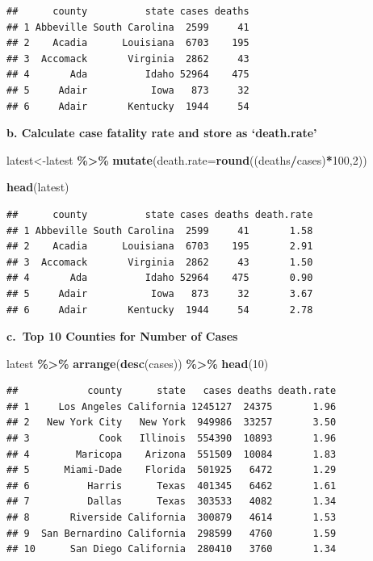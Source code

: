 \documentclass[
  openany]{book}
\newenvironment{Shaded}{\begin{snugshade}}{\end{snugshade}}
\newcommand{\AttributeTok}[1]{\textcolor[rgb]{0.13,0.29,0.53}{#1}}
\newcommand{\DecValTok}[1]{\textcolor[rgb]{0.00,0.00,0.81}{#1}}
\newcommand{\FunctionTok}[1]{\textcolor[rgb]{0.13,0.29,0.53}{\textbf{#1}}}
\newcommand{\NormalTok}[1]{#1}
\newcommand{\OtherTok}[1]{\textcolor[rgb]{0.56,0.35,0.01}{#1}}
\newcommand{\SpecialCharTok}[1]{\textcolor[rgb]{0.81,0.36,0.00}{\textbf{#1}}}
\begin{document}
\begin{verbatim}
##      county          state cases deaths
## 1 Abbeville South Carolina  2599     41
## 2    Acadia      Louisiana  6703    195
## 3  Accomack       Virginia  2862     43
## 4       Ada          Idaho 52964    475
## 5     Adair           Iowa   873     32
## 6     Adair       Kentucky  1944     54
\end{verbatim}

\textbf{b. Calculate case fatality rate and store as `death.rate'}

\begin{Shaded}
\begin{Highlighting}[]
\NormalTok{latest}\OtherTok{\textless{}{-}}\NormalTok{latest }\SpecialCharTok{\%\textgreater{}\%} 
  \FunctionTok{mutate}\NormalTok{(}\AttributeTok{death.rate=}\FunctionTok{round}\NormalTok{((deaths}\SpecialCharTok{/}\NormalTok{cases)}\SpecialCharTok{*}\DecValTok{100}\NormalTok{,}\DecValTok{2}\NormalTok{))}

\FunctionTok{head}\NormalTok{(latest)}
\end{Highlighting}
\end{Shaded}

\begin{verbatim}
##      county          state cases deaths death.rate
## 1 Abbeville South Carolina  2599     41       1.58
## 2    Acadia      Louisiana  6703    195       2.91
## 3  Accomack       Virginia  2862     43       1.50
## 4       Ada          Idaho 52964    475       0.90
## 5     Adair           Iowa   873     32       3.67
## 6     Adair       Kentucky  1944     54       2.78
\end{verbatim}

\textbf{c.~Top 10 Counties for Number of Cases}

\begin{Shaded}
\begin{Highlighting}[]
\NormalTok{latest }\SpecialCharTok{\%\textgreater{}\%} 
  \FunctionTok{arrange}\NormalTok{(}\FunctionTok{desc}\NormalTok{(cases)) }\SpecialCharTok{\%\textgreater{}\%} 
  \FunctionTok{head}\NormalTok{(}\DecValTok{10}\NormalTok{)}
\end{Highlighting}
\end{Shaded}

\begin{verbatim}
##            county      state   cases deaths death.rate
## 1     Los Angeles California 1245127  24375       1.96
## 2   New York City   New York  949986  33257       3.50
## 3            Cook   Illinois  554390  10893       1.96
## 4        Maricopa    Arizona  551509  10084       1.83
## 5      Miami-Dade    Florida  501925   6472       1.29
## 6          Harris      Texas  401345   6462       1.61
## 7          Dallas      Texas  303533   4082       1.34
## 8       Riverside California  300879   4614       1.53
## 9  San Bernardino California  298599   4760       1.59
## 10      San Diego California  280410   3760       1.34
\end{verbatim}
\end{document}
